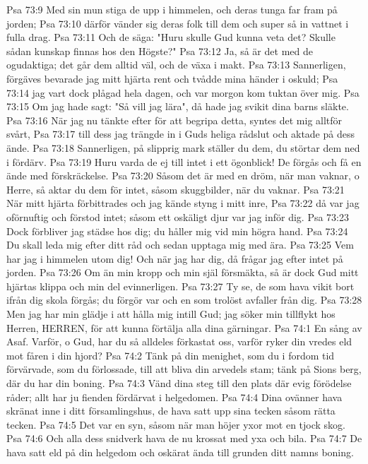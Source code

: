 Psa 73:9  Med sin mun stiga de upp i himmelen, och deras tunga far fram på jorden;
Psa 73:10  därför vänder sig deras folk till dem och super så in vattnet i fulla drag.
Psa 73:11  Och de säga: "Huru skulle Gud kunna veta det? Skulle sådan kunskap finnas hos den Högste?"
Psa 73:12  Ja, så är det med de ogudaktiga; det går dem alltid väl, och de växa i makt.
Psa 73:13  Sannerligen, förgäves bevarade jag mitt hjärta rent och tvådde mina händer i oskuld;
Psa 73:14  jag vart dock plågad hela dagen, och var morgon kom tuktan över mig.
Psa 73:15  Om jag hade sagt: "Så vill jag lära", då hade jag svikit dina barns släkte.
Psa 73:16  När jag nu tänkte efter för att begripa detta, syntes det mig alltför svårt,
Psa 73:17  till dess jag trängde in i Guds heliga rådslut och aktade på dess ände.
Psa 73:18  Sannerligen, på slipprig mark ställer du dem, du störtar dem ned i fördärv.
Psa 73:19  Huru varda de ej till intet i ett ögonblick! De förgås och få en ände med förskräckelse.
Psa 73:20  Såsom det är med en dröm, när man vaknar, o Herre, så aktar du dem för intet, såsom skuggbilder, när du vaknar.
Psa 73:21  När mitt hjärta förbittrades och jag kände styng i mitt inre,
Psa 73:22  då var jag oförnuftig och förstod intet; såsom ett oskäligt djur var jag inför dig.
Psa 73:23  Dock förbliver jag städse hos dig; du håller mig vid min högra hand.
Psa 73:24  Du skall leda mig efter ditt råd och sedan upptaga mig med ära.
Psa 73:25  Vem har jag i himmelen utom dig! Och när jag har dig, då frågar jag efter intet på jorden.
Psa 73:26  Om än min kropp och min själ försmäkta, så är dock Gud mitt hjärtas klippa och min del evinnerligen.
Psa 73:27  Ty se, de som hava vikit bort ifrån dig skola förgås; du förgör var och en som trolöst avfaller från dig.
Psa 73:28  Men jag har min glädje i att hålla mig intill Gud; jag söker min tillflykt hos Herren, HERREN, för att kunna förtälja alla dina gärningar.
Psa 74:1  En sång av Asaf. Varför, o Gud, har du så alldeles förkastat oss, varför ryker din vredes eld mot fåren i din hjord?
Psa 74:2  Tänk på din menighet, som du i fordom tid förvärvade, som du förlossade, till att bliva din arvedels stam; tänk på Sions berg, där du har din boning.
Psa 74:3  Vänd dina steg till den plats där evig förödelse råder; allt har ju fienden fördärvat i helgedomen.
Psa 74:4  Dina ovänner hava skränat inne i ditt församlingshus, de hava satt upp sina tecken såsom rätta tecken.
Psa 74:5  Det var en syn, såsom när man höjer yxor mot en tjock skog.
Psa 74:6  Och alla dess snidverk hava de nu krossat med yxa och bila.
Psa 74:7  De hava satt eld på din helgedom och oskärat ända till grunden ditt namns boning.
